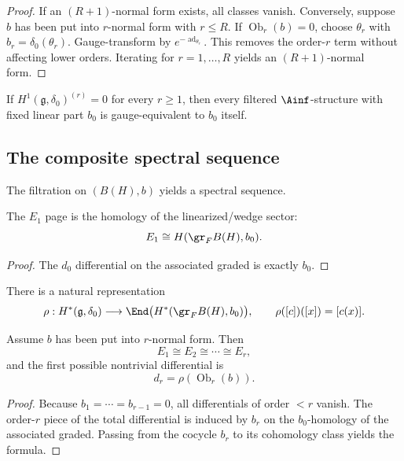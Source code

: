 \begin{proof}
If an $(R+1)$-normal form exists, all classes vanish. Conversely, suppose $b$ has been put into $r$-normal form with $r\le R$. If $\operatorname{Ob}_r(b)=0$, choose $\theta_r$ with $b_r=\delta_0(\theta_r)$. Gauge-transform by $e^{-\operatorname{ad}_{\theta_r}}$. This removes the order-$r$ term without affecting lower orders. Iterating for $r=1,\dots,R$ yields an $(R+1)$-normal form.
\end{proof}

\begin{corollary}
If $H^1(\mathfrak g,\delta_0)^{(r)}=0$ for every $r\ge1$, then every filtered $\Ainf$-structure with fixed linear part $b_0$ is gauge-equivalent to $b_0$ itself.
\end{corollary}

\subsection{The composite spectral sequence}

The filtration on $(B(H),b)$ yields a spectral sequence.

\begin{proposition}
The $E_1$ page is the homology of the linearized/wedge sector:
\[
E_1\cong H(\gr_FB(H),b_0).
\]
\end{proposition}

\begin{proof}
The $d_0$ differential on the associated graded is exactly $b_0$.
\end{proof}

There is a natural representation
\[
\rho:H^\ast(\mathfrak g,\delta_0)\longrightarrow
\End\big(H^\ast(\gr_FB(H),b_0)\big),
\qquad
\rho([c])([x])=[c(x)].
\]

\begin{theorem}
Assume $b$ has been put into $r$-normal form. Then
\[
E_1\cong E_2\cong\cdots\cong E_r,
\]
and the first possible nontrivial differential is
\[
d_r=\rho(\operatorname{Ob}_r(b)).
\]
\end{theorem}

\begin{proof}
Because $b_1=\cdots=b_{r-1}=0$, all differentials of order $<r$ vanish. The order-$r$ piece of the total differential is induced by $b_r$ on the $b_0$-homology of the associated graded. Passing from the cocycle $b_r$ to its cohomology class yields the formula.
\end{proof}

